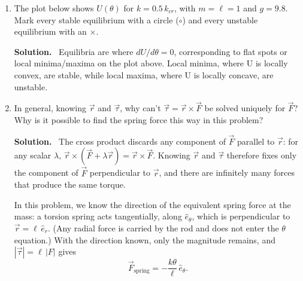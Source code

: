 \documentclass[11pt,letterpaper]{article}
\newenvironment{solution}{\par\smallskip\color{blue!60!black}\textbf{Solution.}\ }{\par}
\begin{document}
\begin{enumerate}[resume*=quiz, itemsep=10pt]

\item The plot below shows $U(\theta)$ for $k = 0.5\,k_{cr}$, with $m = \ell = 1$ and $g = 9.8$. Mark every stable equilibrium with a circle ($\circ$) and every unstable equilibrium with an $\times$.

\begin{center}
\end{center}

\begin{solution}
Equilibria are where $dU/d\theta = 0$, corresponding to flat spots or local minima/maxima on the plot above. Local minima, where U is locally convex, are stable, while local maxima, where U is locally concave, are unstable.

\end{solution}

\item In general, knowing $\vec{r}$ and $\vec{\tau}$, why can't $\vec{\tau} = \vec{r} \times \vec{F}$ be solved uniquely for $\vec{F}$? Why is it possible to find the spring force this way in this problem?

\begin{solution}
The cross product discards any component of $\vec F$ parallel to $\vec r$: for any scalar $\lambda$, $\vec r \times (\vec F + \lambda \vec r) = \vec r \times \vec F$. Knowing $\vec r$ and $\vec\tau$ therefore fixes only the component of $\vec F$ perpendicular to $\vec r$, and there are infinitely many forces that produce the same torque.

In this problem, we know the direction of the equivalent spring force at the mass: a torsion spring acts tangentially, along $\hat e_\theta$, which is perpendicular to $\vec r = \ell\,\hat e_r$. (Any radial force is carried by the rod and does not enter the $\theta$ equation.) With the direction known, only the magnitude remains, and $|\vec\tau| = \ell\,|F|$ gives
\[
\vec F_{\text{spring}} = -\frac{k\theta}{\ell}\,\hat e_\theta .
\]
\end{solution}

\end{enumerate}
\end{document}
